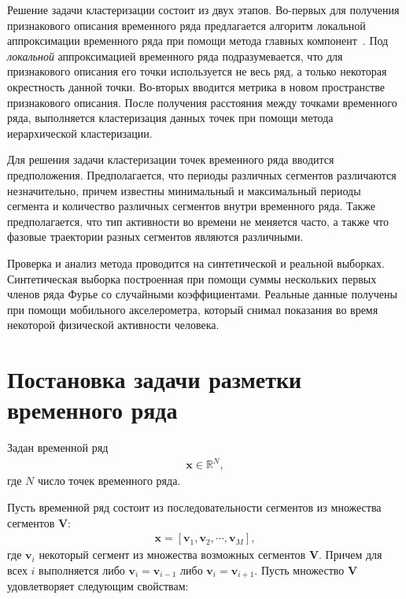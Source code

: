\documentclass[12pt, twoside]{article}
\numberwithin{equation}{section}
\begin{document}
Решение задачи кластеризации состоит из двух этапов. Во-первых для получения признакового описания временного ряда предлагается алгоритм локальной аппроксимации временного ряда при помощи метода главных компонент~\cite{Shiglavsi1997}. Под \textit{локальной} аппроксимацией временного ряда подразумевается, что для признакового описания его точки используется не весь ряд, а только некоторая окрестность данной точки. Во-вторых вводится метрика в новом пространстве признакового описания. После получения расстояния между точками временного ряда, выполняется кластеризация данных точек при помощи метода иерархической кластеризации.

Для решения задачи кластеризации точек временного ряда вводится предположения. Предполагается, что периоды различных сегментов различаются незначительно, причем известны минимальный и максимальный периоды сегмента и количество различных сегментов внутри временного ряда. Также предполагается, что тип активности во времени не меняется часто, а также что фазовые траектории разных сегментов являются различными. 

Проверка и анализ метода проводится на синтетической и реальной выборках. Синтетическая выборка построенная при помощи суммы нескольких первых членов ряда Фурье со случайными коэффициентами. Реальные данные получены при помощи мобильного акселерометра, который снимал показания во время некоторой физической активности человека.



\section{Постановка задачи разметки временного ряда}

Задан временной ряд
\begin{equation}
\label{eq:st:1}
\begin{aligned}
\textbf{x} \in \mathbb{R}^{N},
\end{aligned}
\end{equation}
где $N$ число точек временного ряда.

Пусть временной ряд состоит из последовательности сегментов из множества сегментов $\mathbf{V}$:
\begin{equation}
\label{eq:st:2}
\begin{aligned}
\textbf{x} = [\textbf{v}_1, \textbf{v}_2, \cdots, \textbf{v}_M],
\end{aligned}
\end{equation}
где $\textbf{v}_i$ некоторый сегмент из множества возможных сегментов $\mathbf{V}$. Причем для всех $i$ выполняется либо $\textbf{v}_i = \textbf{v}_{i-1}$ либо $\textbf{v}_i = \textbf{v}_{i+1}$. Пусть множество $\mathbf{V}$ удовлетворяет следующим свойствам:
\end{document}

